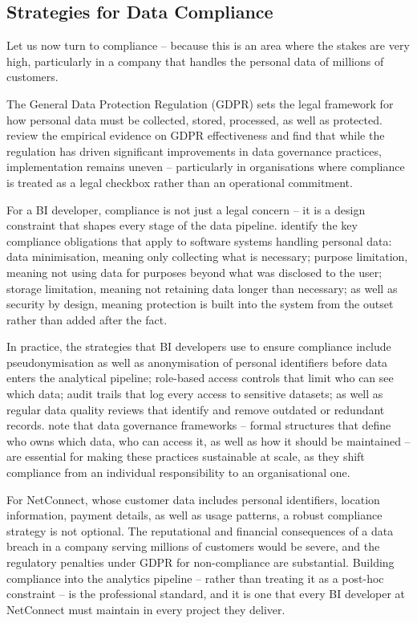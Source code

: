 \documentclass[12pt,a4paper]{article}
\begin{document}
\subsection{Strategies for Data Compliance}

Let us now turn to compliance -- because this is an area where the stakes are very high, particularly in a company that handles the personal data of millions of customers.

The General Data Protection Regulation (GDPR) sets the legal framework for how personal data must be collected, stored, processed, as well as protected. \textcite{Li2023} review the empirical evidence on GDPR effectiveness and find that while the regulation has driven significant improvements in data governance practices, implementation remains uneven -- particularly in organisations where compliance is treated as a legal checkbox rather than an operational commitment.

For a BI developer, compliance is not just a legal concern -- it is a design constraint that shapes every stage of the data pipeline. \textcite{Franke2024} identify the key compliance obligations that apply to software systems handling personal data: data minimisation, meaning only collecting what is necessary; purpose limitation, meaning not using data for purposes beyond what was disclosed to the user; storage limitation, meaning not retaining data longer than necessary; as well as security by design, meaning protection is built into the system from the outset rather than added after the fact.

In practice, the strategies that BI developers use to ensure compliance include pseudonymisation as well as anonymisation of personal identifiers before data enters the analytical pipeline; role-based access controls that limit who can see which data; audit trails that log every access to sensitive datasets; as well as regular data quality reviews that identify and remove outdated or redundant records. \textcite{Yukhno2022} note that data governance frameworks -- formal structures that define who owns which data, who can access it, as well as how it should be maintained -- are essential for making these practices sustainable at scale, as they shift compliance from an individual responsibility to an organisational one.

For NetConnect, whose customer data includes personal identifiers, location information, payment details, as well as usage patterns, a robust compliance strategy is not optional. The reputational and financial consequences of a data breach in a company serving millions of customers would be severe, and the regulatory penalties under GDPR for non-compliance are substantial. Building compliance into the analytics pipeline -- rather than treating it as a post-hoc constraint -- is the professional standard, and it is one that every BI developer at NetConnect must maintain in every project they deliver.
\end{document}

